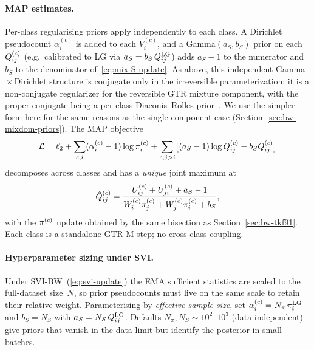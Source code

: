 \paragraph{MAP estimates.}
Per-class regularising priors apply independently to each class.
A Dirichlet pseudocount $\alpha^{(c)}_i$ is added to each
$V^{(c)}_i$, and a Gamma$(a_S, b_S)$ prior on each
$Q^{(c)}_{ij}$ (e.g.\ calibrated to LG via
$a_S = b_S\,Q^{\mathrm{LG}}_{ij}$) adds $a_S-1$ to the numerator
and $b_S$ to the denominator of~\eqref{eq:mix-S-update}.
As above, this independent-Gamma${}\times{}$Dirichlet structure is
conjugate only in the irreversible parameterization; it is a
non-conjugate regularizer for the reversible GTR mixture component,
with the proper conjugate being a per-class Diaconis--Rolles
prior~\cite{DiaconisRolles2006}.  We use the simpler form here for
the same reasons as the single-component case\ifdefined\MIXDOMPAPER{}
(Section~\ref{sec:bw-mixdom-priors})\fi.
The MAP objective
\begin{equation}\label{eq:mix-map-obj}
\mathcal{L} = \ell_2
  + \sum_{c,i}(\alpha^{(c)}_i - 1)\log\pi^{(c)}_i
  + \sum_{c,j>i}\bigl[(a_S - 1)\log Q^{(c)}_{ij}
          - b_S Q^{(c)}_{ij}\bigr]
\end{equation}
decomposes across classes and has a \emph{unique} joint maximum
at
\begin{equation}\label{eq:mix-map-S}
\hat{Q}^{(c)}_{ij}
= \frac{U^{(c)}_{ij}+U^{(c)}_{ji} + a_S - 1}
       {W^{(c)}_i \pi^{(c)}_j + W^{(c)}_j \pi^{(c)}_i + b_S},
\end{equation}
with the $\pi^{(c)}$ update obtained by the same bisection as
Section~\ref{sec:bw-tkf91}.
Each class is a standalone GTR M-step; no cross-class coupling.

\paragraph{Hyperparameter sizing under SVI.}
Under SVI-BW~(\ref{eq:svi-update}) the EMA sufficient statistics are
scaled to the full-dataset size~$N$, so prior pseudocounts must
live on the same scale to retain their relative weight.
Parameterising by \emph{effective sample size},
set $\alpha^{(c)}_i = N_\pi\,\pi^{\mathrm{LG}}_i$
and $b_S = N_S$ with $a_S = N_S\,Q^{\mathrm{LG}}_{ij}$.
Defaults $N_\pi, N_S \sim 10^2\text{--}10^3$
(data-independent) give priors that vanish in the data limit
but identify the posterior in small batches.


